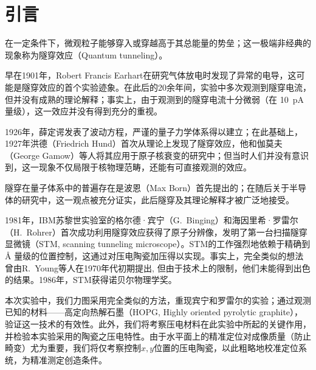 \documentclass[aps,pre,12pt,preprint,%
	onecolumn,showpacs,showkeys,nofootinbib]{revtex4-1}
\begin{document}
\section{引言}
	在一定条件下，微观粒子能够穿入或穿越高于其总能量的势垒；这一极端非经典的现象称为隧穿效应（Quantum tunneling）。
	
	早在1901年，Robert Francis Earhart在研究气体放电时发现了异常的电导，这可能是隧穿效应的首个实验迹象\supercite{tunnelOrigin}。在此后的20余年间，实验中多次观测到隧穿电流，但并没有成熟的理论解释；事实上，由于观测到的隧穿电流十分微弱（在 \SI{10}{\pA} 量级），这一效应并没有得到充分的重视\supercite{mohsen2003quantum}。
	
	1926年，薛定谔发表了波动方程，严谨的量子力学体系得以建立；在此基础上，1927年洪德（Friedrich Hund）首次从理论上发现了隧穿效应，他和伽莫夫（George Gamow）等人将其应用于原子核衰变的研究中；但当时人们并没有意识到，这一现象不仅局限于核物理范畴，还能有可直接观测的效应\supercite{mohsen2003quantum}。
	
	隧穿在量子体系中的普遍存在是波恩（Max Born）首先提出的；在随后关于半导体的研究中，这一观点被充分证实，此后隧穿及其理论解释才被广泛地接受\supercite{mohsen2003quantum}。
	
	1981年，IBM苏黎世实验室的格尔德·宾宁（G.~Binging）和海因里希·罗雷尔（H.~Rohrer）首次成功利用隧穿效应获得了原子分辨像，发明了第一台扫描隧穿显微镜（STM, scanning tunneling microscope）。STM的工作强烈地依赖于精确到 \si{\angstrom} 量级的位置控制，这通过对压电陶瓷加压得以实现\supercite{binnig1982surface}。事实上，完全类似的想法曾由R.~Young等人在1970年代初期提出\supercite{young1972topografiner}, 但由于技术上的限制，他们未能得到出色的结果。1986年，STM获得诺贝尔物理学奖。
	
	本次实验中，我们力图采用完全类似的方法，重现宾宁和罗雷尔的实验；通过观测已知的材料——高定向热解石墨（HOPG, Highly oriented pyrolytic graphite），验证这一技术的有效性。此外，我们将考察压电材料在此实验中所起的关键作用，并检验本实验采用的陶瓷之压电特性。由于水平面上的精准定位对成像质量（防止畸变）尤为重要，我们将仅考察控制$x,y$位置的压电陶瓷，以此粗略地校准定位系统，为精准测定创造条件。
\end{document}
